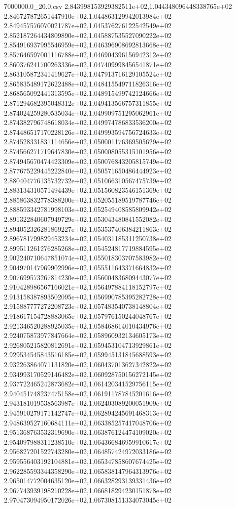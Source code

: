 \begin{filecontents*}{7000000.0_20.0.csv}
2.843998153929382511e+02,1.044348096448338765e+02
2.846727872651447910e+02,1.044863129942013984e+02
2.849457576070021787e+02,1.045376276122542549e+02
2.852187264434809890e+02,1.045887535527090222e+02
2.854916937995546959e+02,1.046396908692813668e+02
2.857646597001116788e+02,1.046904396156942312e+02
2.860376241700263336e+02,1.047409998456541871e+02
2.863105872341419627e+02,1.047913716129105524e+02
2.865835489172622488e+02,1.048415549711826316e+02
2.868565092441313595e+02,1.048915499742124666e+02
2.871294682395048312e+02,1.049413566757311855e+02
2.874024259280535034e+02,1.049909751295062961e+02
2.874382796748618034e+02,1.049974786833536200e+02
2.874486517170228126e+02,1.049993594756724633e+02
2.874528331831114656e+02,1.050001176369505629e+02
2.874566271719647830e+02,1.050008055315101956e+02
2.874945670474423309e+02,1.050076843205815749e+02
2.877675229445222840e+02,1.050571650486444923e+02
2.880404776135732732e+02,1.051066310567475739e+02
2.883134310571494439e+02,1.051560823546151369e+02
2.885863832778388200e+02,1.052055189519787746e+02
2.888593342781998103e+02,1.052549408585809942e+02
2.891322840607949729e+02,1.053043480841552082e+02
2.894052326281869227e+02,1.053537406384211863e+02
2.896781799829453234e+02,1.054031185311250738e+02
2.899511261276285268e+02,1.054524817719884595e+02
2.902240710647851074e+02,1.055018303707583982e+02
2.904970147969902996e+02,1.055511643371664832e+02
2.907699573267814230e+02,1.056004836809443077e+02
2.910428986567166021e+02,1.056497884118152797e+02
2.913158387893502095e+02,1.056990785395282728e+02
2.915887777272208723e+02,1.057483540738148804e+02
2.918617154728883065e+02,1.057976150244048767e+02
2.921346520288925035e+02,1.058468614010434976e+02
2.924075873977847664e+02,1.058960932134605173e+02
2.926805215820812691e+02,1.059453104713929861e+02
2.929534545843516185e+02,1.059945131845688593e+02
2.932263864071131820e+02,1.060437013627342822e+02
2.934993170529146482e+02,1.060928750156272145e+02
2.937722465242873682e+02,1.061420341529756115e+02
2.940451748237475158e+02,1.061911787845201616e+02
2.943181019538563987e+02,1.062403089200051909e+02
2.945910279171142747e+02,1.062894245691468313e+02
2.948639527160684111e+02,1.063385257417048706e+02
2.951368763532319690e+02,1.063876124474109020e+02
2.954097988311238510e+02,1.064366846959910617e+02
2.956827201522743280e+02,1.064857424972033186e+02
2.959556403192104881e+02,1.065347858607674425e+02
2.962285593344358290e+02,1.065838147964313976e+02
2.965014772004635120e+02,1.066328293139331436e+02
2.967743939198210228e+02,1.066818294230151878e+02
2.970473094950172026e+02,1.067308151334073045e+02

\end{filecontents*}
